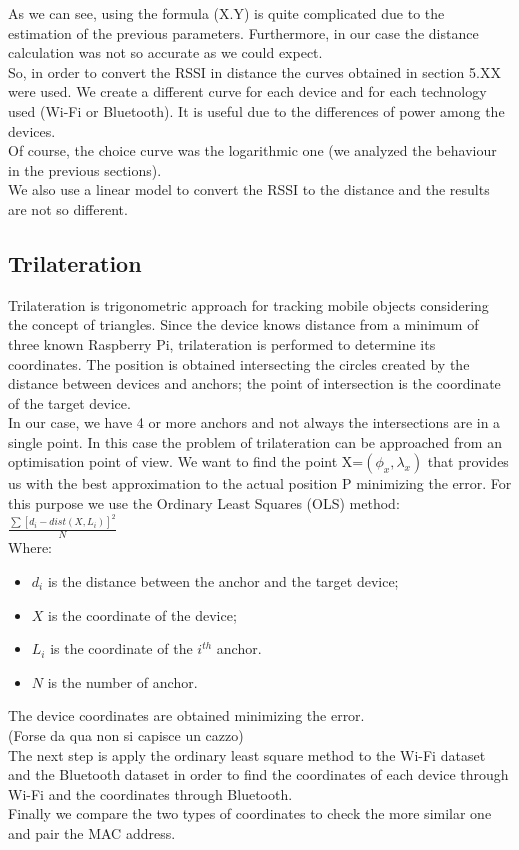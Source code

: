 \linebreak
As we can see, using the formula (X.Y) is quite complicated due to the estimation of the previous parameters. Furthermore, in our case the distance calculation was not so accurate as we could expect.\\
\linebreak
So, in order to convert the RSSI in distance the curves obtained in section 5.XX were used. We create a different curve for each device and for each technology used (Wi-Fi or Bluetooth). It is useful due to the differences of power among the devices.\\
\linebreak
Of course, the choice curve was the logarithmic one (we analyzed the behaviour in the previous sections).\\
We also use a linear model to convert the RSSI to the distance and the results are not so different.

\subsection{Trilateration}
Trilateration is trigonometric approach for tracking mobile objects considering the concept of triangles. Since the device knows distance from a minimum of three known Raspberry Pi, trilateration is performed to determine its coordinates. The position is obtained intersecting the circles created by the distance between devices and anchors; the point of intersection is the coordinate of the target device.\\
\linebreak
In our case, we have 4 or more anchors and not always the intersections are in a single point. In this case the problem of trilateration can be approached from an optimisation point of view. We want to find the point X=\(\left(\phi_x, \lambda_x\right)\) that provides us with the best approximation to the actual position P minimizing the error. For this purpose we use the Ordinary Least Squares (OLS) method: \(\frac{\sum { \left[d_i  -dist\left(X,L_i\right)\right] }^2 }{N}\)\\
Where:
\begin{itemize}
\item \(d_i\) is the distance between the anchor and the target device;
\item \(X\) is the coordinate of the device;
\item \(L_i\) is the coordinate of the \(i^{th}\) anchor.
\item \(N\) is the number of anchor.
\end{itemize}
The device coordinates are obtained minimizing the error.\\
\linebreak
(Forse da qua non si capisce un cazzo)\\
The next step is apply the ordinary least square method to the Wi-Fi dataset and the Bluetooth dataset in order to find the coordinates of each device through Wi-Fi and the coordinates through Bluetooth.\\
Finally we compare the two types of coordinates to check the more similar one and pair the MAC address.

